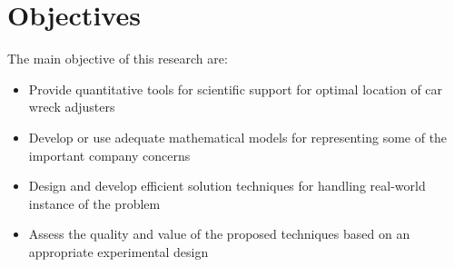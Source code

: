 \section{Objectives}
The main objective
of this research are:
\begin{itemize}
\item Provide quantitative tools
  for scientific support
  for optimal location
  of car wreck adjusters
\item Develop or use
  adequate mathematical models
  for representing
  some of the important company concerns
\item Design and develop efficient solution techniques
  for handling real-world instance of the problem
\item Assess 
  the quality and value of the proposed techniques
  based on an appropriate experimental design
\end{itemize}
